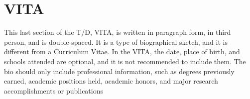 \newpage 
\section*{\MakeUppercase{Vita}}


This last section of the T/D, VITA, is written in paragraph form, in third person, and is double-spaced. It is a type of biographical sketch, and it is different from a Curriculum Vitae. In the VITA, the date, place of birth, and schools attended are optional, and it is not recommended to include them. The bio should only include professional information, such as degrees previously earned, academic positions held, academic honors, and major research accomplishments or publications